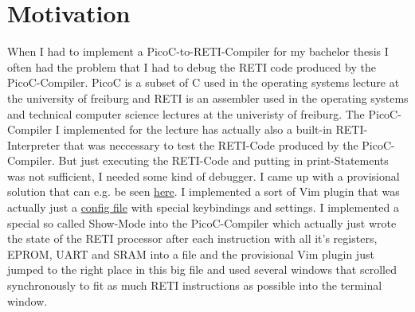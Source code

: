 \documentclass{report}
\begin{document}
\fontsize{10pt}{12pt}\selectfont




\tableofcontents
\thispagestyle{empty}
\clearpage
\pagestyle{plain}

\listoffigures
\newpage
\listoftables

\clearpage
{}
\pagestyle{default}

\chapter{Motivation}

When I had to implement a PicoC-to-RETI-Compiler for my bachelor thesis I often had the problem that I had to debug the RETI code produced by the \alert{PicoC-Compiler}. \alert{PicoC} is a subset of C used in the operating systems lecture at the university of freiburg and \alert{RETI} is an assembler used in the operating systems and technical computer science lectures at the univeristy of freiburg. The PicoC-Compiler I implemented for the lecture has actually also a built-in \alert{RETI-Interpreter} that was neccessary to test the RETI-Code produced by the PicoC-Compiler. But just executing the RETI-Code and putting in print-Statements was not sufficient, I needed some kind of debugger. I came up with a provisional solution that can e.g. be seen \href{https://asciinema.org/a/526542}{here}. I implemented a sort of Vim plugin that was actually just a \href{https://github.com/matthejue/PicoC-Compiler/blob/master/src/interpr_showcase.vim}{config file} with special keybindings and settings. I implemented a special so called \alert{Show-Mode} into the PicoC-Compiler which actually just wrote the state of the RETI processor after each instruction with all it's registers, EPROM, UART and SRAM into a file and the provisional Vim plugin just jumped to the right place in this big file and used several windows that scrolled synchronously to fit as much RETI instructions as possible into the terminal window.
\end{document}
